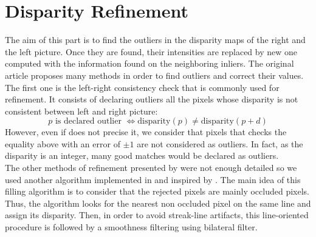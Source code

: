 \documentclass{ipol}
\begin{document}
\section{Disparity Refinement}

The aim of this part is to find the outliers in the disparity maps of the right and the left picture. Once they are found, their intensities are replaced by new one computed with the information found on the neighboring inliers. The original article
\cite{adCensus} proposes many methods in order to find outliers and correct their values.\\
The first one is the left-right consistency check that is commonly used for refinement. It consists of declaring outliers all the pixels whose disparity is not consistent between left and right picture:
\[
	p \text{ is declared outlier } \Leftrightarrow \text{disparity}(p) \neq \text{disparity}(p+d)
\]
However, even if \cite{adCensus} does not precise it, we consider that pixels that checks the equality above with an error of $\pm 1$ are not considered as outliers. In fact, as the disparity is an integer, many good matches would be declared as outliers.\\
The other methods of refinement presented by \cite{adCensus} were not enough detailed so we used another algorithm implemented in \cite{ipolFill} and inspired by \cite{cvFill}.
The main idea of this filling algorithm is to consider that the rejected pixels are mainly occluded pixels. Thus, the algorithm looks for the nearest non occluded pixel on the same line and assign its disparity. Then, in order to avoid streak-line artifacts, this line-oriented procedure is followed by a smoothness filtering using bilateral filter.
\end{document}
